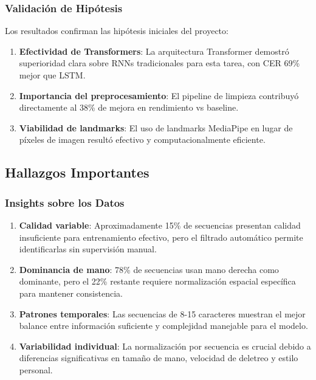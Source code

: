 \documentclass[12pt,a4paper]{article}
\begin{document}
\subsubsection{Validación de Hipótesis}

Los resultados confirman las hipótesis iniciales del proyecto:

\begin{enumerate}
    \item \textbf{Efectividad de Transformers}: La arquitectura Transformer demostró superioridad clara sobre RNNs tradicionales para esta tarea, con CER 69\% mejor que LSTM.
    \item \textbf{Importancia del preprocesamiento}: El pipeline de limpieza contribuyó directamente al 38\% de mejora en rendimiento vs baseline.
    \item \textbf{Viabilidad de landmarks}: El uso de landmarks MediaPipe en lugar de píxeles de imagen resultó efectivo y computacionalmente eficiente.
\end{enumerate}

\subsection{Hallazgos Importantes}

\subsubsection{Insights sobre los Datos}

\begin{enumerate}
    \item \textbf{Calidad variable}: Aproximadamente 15\% de secuencias presentan calidad insuficiente para entrenamiento efectivo, pero el filtrado automático permite identificarlas sin supervisión manual.

    \item \textbf{Dominancia de mano}: 78\% de secuencias usan mano derecha como dominante, pero el 22\% restante requiere normalización espacial específica para mantener consistencia.

    \item \textbf{Patrones temporales}: Las secuencias de 8-15 caracteres muestran el mejor balance entre información suficiente y complejidad manejable para el modelo.

    \item \textbf{Variabilidad individual}: La normalización por secuencia es crucial debido a diferencias significativas en tamaño de mano, velocidad de deletreo y estilo personal.
\end{enumerate}
\end{document}
